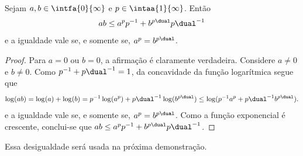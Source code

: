 \begin{prop}
\label{prop:ana.desig.young}
Sejam $a,b \in \intfa{0}{\infty}$ e $p \in \intaa{1}{\infty}$. Então
	\begin{equation*}
	ab \leq a^p p\inv + b^{p\dual} {p\dual}\inv
	\end{equation*}
e a igualdade vale se, e somente se, $a^p = b^{p\dual}$.
\end{prop}
\begin{proof}
Para $a=0$ ou $b=0$, a afirmação é claramente verdadeira. Considere $a \neq 0$ e $b \neq 0$. Como $p\inv + {p\dual}\inv = 1$, da concavidade da função logarítmica segue que
	\begin{align*}
	\log(ab) = \log(a) + \log(b) = p\inv \log(a^p) + {p\dual}\inv \log(b^{p\dual}) \leq \log(p\inv a^p + {p\dual}\inv b^{p\dual}).
	\end{align*}
e a igualdade vale se, e somente se, $a^p = b^{p\dual}$. Como a função exponencial é crescente, conclui-se que $ab \leq a^p p\inv + b^{p\dual} {p\dual}\inv$.
\end{proof}

Essa desigualdade será usada na próxima demonstração.

